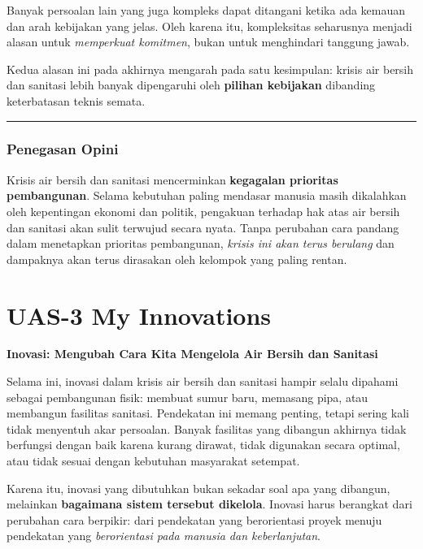 \documentclass[
  letterpaper,
  DIV=11,
  numbers=noendperiod]{scrreprt}
\begin{document}
Banyak persoalan lain yang juga kompleks dapat ditangani ketika ada
kemauan dan arah kebijakan yang jelas. Oleh karena itu, kompleksitas
seharusnya menjadi alasan untuk \emph{memperkuat komitmen}, bukan untuk
menghindari tanggung jawab.

Kedua alasan ini pada akhirnya mengarah pada satu kesimpulan: krisis air
bersih dan sanitasi lebih banyak dipengaruhi oleh \textbf{pilihan
kebijakan} dibanding keterbatasan teknis semata.

\begin{center}\rule{0.5\linewidth}{0.5pt}\end{center}

\subsection{Penegasan Opini}\label{penegasan-opini}

Krisis air bersih dan sanitasi mencerminkan \textbf{kegagalan prioritas
pembangunan}. Selama kebutuhan paling mendasar manusia masih dikalahkan
oleh kepentingan ekonomi dan politik, pengakuan terhadap hak atas air
bersih dan sanitasi akan sulit terwujud secara nyata. Tanpa perubahan
cara pandang dalam menetapkan prioritas pembangunan, \emph{krisis ini
akan terus berulang} dan dampaknya akan terus dirasakan oleh kelompok
yang paling rentan.


\chapter{UAS-3 My Innovations}\label{uas-3-my-innovations}

\textbf{Inovasi: Mengubah Cara Kita Mengelola Air Bersih dan Sanitasi}

Selama ini, inovasi dalam krisis air bersih dan sanitasi hampir selalu
dipahami sebagai pembangunan fisik: membuat sumur baru, memasang pipa,
atau membangun fasilitas sanitasi. Pendekatan ini memang penting, tetapi
sering kali tidak menyentuh akar persoalan. Banyak fasilitas yang
dibangun akhirnya tidak berfungsi dengan baik karena kurang dirawat,
tidak digunakan secara optimal, atau tidak sesuai dengan kebutuhan
masyarakat setempat.

Karena itu, inovasi yang dibutuhkan bukan sekadar soal apa yang
dibangun, melainkan \textbf{bagaimana sistem tersebut dikelola}. Inovasi
harus berangkat dari perubahan cara berpikir: dari pendekatan yang
berorientasi proyek menuju pendekatan yang \emph{berorientasi pada
manusia dan keberlanjutan}.
\end{document}
